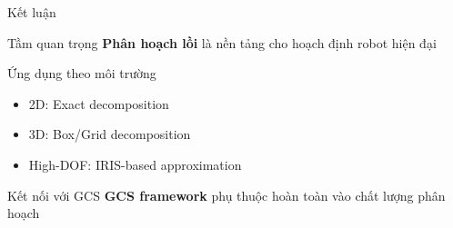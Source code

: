\documentclass[aspectratio=169]{beamer}
\begin{document}


\begin{frame}{Kết luận}

    \begin{block}{Tầm quan trọng}
        \textbf{Phân hoạch lồi} là nền tảng cho hoạch định robot hiện đại
    \end{block}


    \begin{alertblock}{Ứng dụng theo môi trường}
        \begin{itemize}
            \item 2D: Exact decomposition
            \item 3D: Box/Grid decomposition
            \item High-DOF: IRIS-based approximation
        \end{itemize}
    \end{alertblock}

    \begin{block}{Kết nối với GCS}
        \textbf{GCS framework} phụ thuộc hoàn toàn vào chất lượng phân hoạch
    \end{block}

\end{frame}
\end{document}
